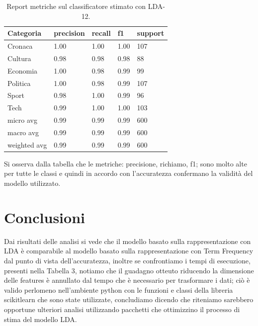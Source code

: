 \documentclass[runningheads]{llncs}
\begin{document}
\begin{table}[]
\centering
\begin{tabular}{lllll}
\hline
Categoria    & precision & recall & f1   & support \\ \hline
Cronaca      & 1.00   &   1.00    &  1.00  & 107      \\
Cultura      & 0.98      & 0.98   & 0.98 & 88      \\
Economia     & 1.00      & 0.98   & 0.99 & 99      \\
Politica     & 1.00      & 0.98   & 0.99 & 107      \\
Sport        & 0.98      & 1.00   & 0.99 & 96      \\
Tech         & 0.99      & 1.00   & 1.00 & 103      \\ \hline
micro avg    & 0.99      & 0.99   & 0.99 & 600     \\ \hline
macro avg    & 0.99      & 0.99   & 0.99 & 600     \\ \hline
weighted avg & 0.99      & 0.99   & 0.99 & 600    \\  \hline
\end{tabular}
    \caption{Report metriche sul classificatore stimato con LDA-12.}%

\end{table}



Si osserva dalla tabella che le metriche: precisione, richiamo, f1; sono molto alte per tutte le classi e quindi in accordo con l'accuratezza confermano la validit\`a del modello utilizzato.


\section{Conclusioni}

Dai risultati delle analisi si vede che il modello basato sulla rappresentazione con LDA \`e comparabile al modello basato sulla rappresentazione con Term Frequency dal punto di vista dell'accuratezza, inoltre se confrontiamo i tempi di esecuzione, presenti nella Tabella 3, notiamo che il guadagno otteuto riducendo la dimensione delle features \`e annullato dal tempo che \`e necessario per trasformare i dati; ci\`o \`e valido perlomeno nell'ambiente python con le funzioni e classi della libreria scikitlearn che sono state utilizzate, concludiamo dicendo che riteniamo sarebbero opportune ulteriori analisi utilizzando pacchetti che ottimizzino il processo di stima del modello LDA.
\end{document}
